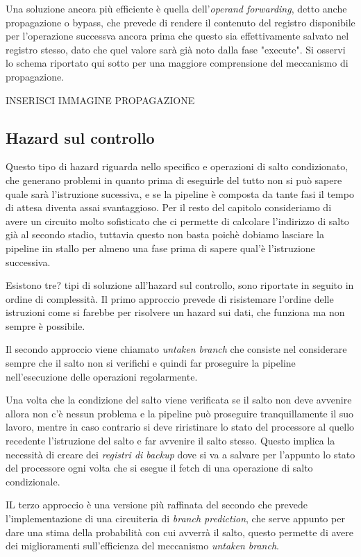 \documentclass[class=book, crop=false, oneside]{standalone}
\begin{document}
Una soluzione ancora più efficiente è quella dell'\emph{operand forwarding}, detto anche propagazione o bypass, che prevede di rendere il contenuto del registro  disponibile per l'operazione successva ancora prima che questo sia effettivamente salvato nel registro stesso, dato che quel valore sarà già noto dalla fase "execute".
Si osservi lo schema riportato qui sotto per una maggiore comprensione del meccanismo di propagazione.

INSERISCI IMMAGINE PROPAGAZIONE

\subsection{Hazard sul controllo}
Questo tipo di hazard riguarda nello specifico e operazioni di salto condizionato, che generano problemi in quanto prima di eseguirle del tutto non si può sapere quale sarà l'istruzione sucessiva, e se la pipeline è composta da tante fasi il tempo di attesa diventa assai svantaggioso.
Per il resto del capitolo consideriamo di avere un circuito molto sofisticato che ci permette di calcolare l’indirizzo di salto già al secondo stadio, tuttavia questo non basta poichè dobiamo lasciare la pipeline iin stallo per almeno una fase prima di sapere qual'è l'istruzione successiva.

Esistono tre? tipi di soluzione all'hazard sul controllo, sono riportate in seguito in ordine di complessità.
Il primo approccio prevede di risistemare l'ordine delle istruzioni come si farebbe per risolvere un hazard sui dati, che funziona ma non sempre è possibile.

Il secondo approccio viene chiamato \emph{untaken branch} che consiste nel considerare sempre che il salto non si verifichi e quindi far proseguire la pipeline nell'esecuzione delle operazioni regolarmente.

Una volta che la condizione del salto viene verificata se il salto non deve avvenire allora non c'è nessun problema e la pipeline può proseguire tranquillamente il suo lavoro, mentre in caso contrario si deve riristinare lo stato del processore al quello recedente l'istruzione del salto e far avvenire il salto stesso.
Questo implica la necessità di creare dei \emph{registri di backup} dove si va a salvare per l'appunto lo stato del processore ogni volta che si esegue il fetch di una operazione di salto condizionale.

IL terzo approccio è una versione più raffinata del secondo che prevede l'implementazione di una circuiteria di \emph{branch prediction}, che serve appunto per dare una stima della probabilità con cui avverrà il salto, questo permette di avere dei miglioramenti sull'efficienza del meccanismo \emph{untaken branch}.
\end{document}
